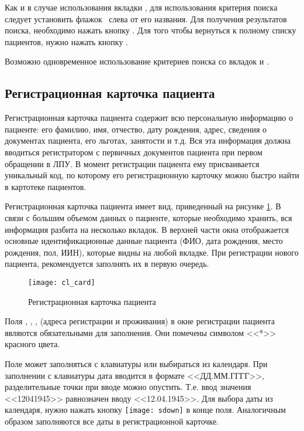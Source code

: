 Как и в случае использования вкладки , для использования критерия поиска следует установить флажок \putx~слева от его названия. Для получения результатов поиска, необходимо нажать кнопку . Для того чтобы вернуться к полному списку пациентов, нужно нажать кнопку  .

Возможно одновременное использование критериев поиска со вкладок  и .

\subsection{Регистрационная карточка пациента} \label{cl_card}

Регистрационная карточка пациента содержит всю персональную информацию о пациенте: его фамилию, имя, отчество, дату рождения, адрес, сведения о документах пациента, его льготах, занятости и т.д. Вся эта информация должна вводиться регистратором с первичных документов пациента при первом обращении в ЛПУ. В момент регистрации пациента ему присваивается уникальный код, по которому его регистрационную карточку можно быстро найти в картотеке пациентов.

Регистрационная карточка пациента имеет вид, приведенный на рисунке \ref{img_cl_card}. В связи с большим объемом данных о пациенте, которые необходимо хранить, вся информация разбита на несколько вкладок. В верхней части окна отображается основные идентификационные данные пациента (ФИО, дата рождения, место рождения, пол, ИИН), которые видны на любой вкладке. При регистрации нового пациента, рекомендуется заполнять их в первую очередь.

\begin{figure}[ht]\centering
 \texttt{[image: cl\_card]}
 \caption{Регистрационная карточка пациента}
 \label{img_cl_card}
\end{figure} 

Поля , , ,  (адреса регистрации и проживания) в окне регистрации пациента являются обязательными для заполнения. Они помечены символом <<*>> красного цвета.

Поле  может заполняться с клавиатуры или выбираться из календаря. При заполнении с клавиатуры дата вводится в формате <<ДД.ММ.ГГГГ>>, разделительные точки при вводе можно опустить. Т.е. ввод значения <<12041945>> равнозначен вводу <<12.04.1945>>. Для выбора даты из календаря, нужно нажать кнопку \texttt{[image: sdown]}  в конце поля. Аналогичным образом заполняются все даты в регистрационной карточке.

